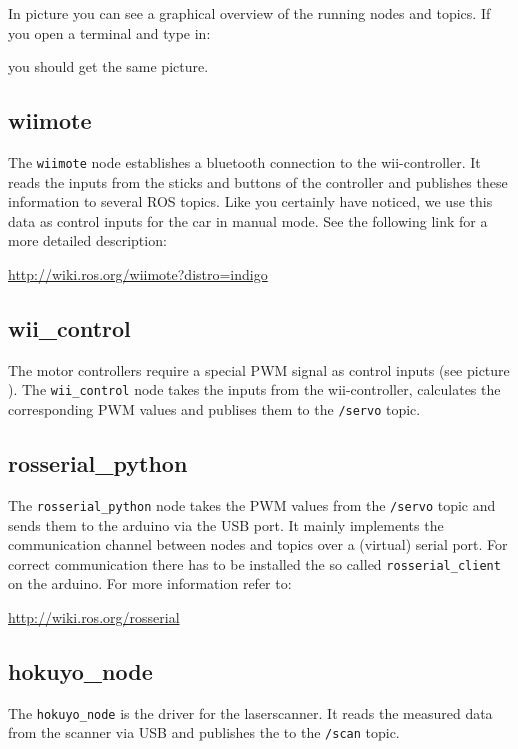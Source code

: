 {In picture  you can see a graphical overview of the running nodes and topics. If you open a terminal and type in:


you should get the same picture.


\subsection{wiimote}
\label{sec:tas_package_drivers_wiimote}
The \texttt{wiimote} node establishes a bluetooth connection to the wii-controller. It reads the inputs from the sticks and buttons of the controller and publishes these information to several ROS topics. Like you certainly have noticed, we use this data as control inputs for the car in manual mode. See the following link for a more detailed description:

\hyperref[http://wiki.ros.org/wiimote?distro=indigo]{http://wiki.ros.org/wiimote?distro=indigo}

\subsection{wii\_control}
\label{sec:tas_package_drivers_wii_control}
The motor controllers require a special PWM signal as control inputs (see picture ). The \texttt{wii\_control} node takes the inputs from the wii-controller, calculates the corresponding PWM values and publises them to the \texttt{/servo} topic.


\subsection{rosserial\_python}
\label{sec:tas_package_drivers_rosserial}
The \texttt{rosserial\_python} node takes the PWM values from the \texttt{/servo} topic and sends them to the arduino via the USB port. It mainly implements the communication channel between nodes and topics over a (virtual) serial port. For correct communication there has to be installed the so called \texttt{rosserial\_client} on the arduino. For more information refer to:

\hyperref[http://wiki.ros.org/rosserial]{http://wiki.ros.org/rosserial}

\subsection{hokuyo\_node}
\label{sec:tas_package_drivers_hokuyo}
The \texttt{hokuyo\_node} is the driver for the laserscanner. It reads the measured data from the scanner via USB and publishes the to the \texttt{/scan} topic.

}
